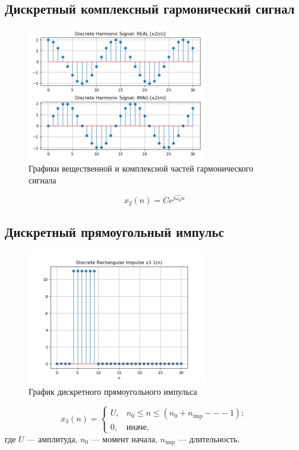 \documentclass[a4paper, 14pt]{extarticle}
\begin{document}
\subsection{Дискретный комплексный гармонический сигнал}
\begin{figure}[h]
    \centering
    \includegraphics[width=0.7\textwidth]{img/signals/4.png}
    \caption{Графики вещественной и комплексной частей гармонического сигнала}%
\end{figure}

\begin{equation}
    x_2(n) = C e ^{j\hat{ \omega_0 } n}
\end{equation}

\clearpage
\subsection{Дискретный прямоугольный импульс}
\begin{figure}[h]
    \centering
    \includegraphics[width=0.7\textwidth]{img/signals/6.png}
    \caption{График дискретного прямоугольного импульса}%
\end{figure}
\begin{equation}
    x_3 (n) = \begin{cases}
        U, &n_0 \le n \le (n_0 + n_\text{imp} --- 1 );\\
        0, &\text{иначе},
    \end{cases}
\end{equation}
где $U$ --- амплитуда, $n_0$ --- момент начала, $n_\text{imp} $ --- длительность.
\end{document}
